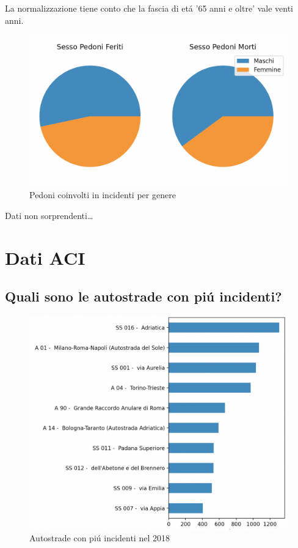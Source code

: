 \documentclass[a4paper]{report}
\begin{document}
La normalizzazione tiene conto che la fascia di et\'a '65 anni e oltre' vale venti anni.

\begin{figure}[!ht]
    \includegraphics[width=\linewidth]{../src/incidenti/incidenti_senza_coords/pedoni/sesso_morti_feriti.png}
    \caption{Pedoni coinvolti in incidenti per genere}
    \label{fig:sesso_morti_feriti}
\end{figure}

Dati non sorprendenti\dots





\newpage
\section{Dati ACI}

\newpage
\subsection{Quali sono le autostrade con pi\'u incidenti?}
\begin{figure}[!ht]
    \includegraphics[width=\linewidth]{../src/incidenti/incidenti_aci/autostrade.png}
    \caption{Autostrade con pi\'u incidenti nel 2018}
    \label{fig:incidenti_autostrade}
\end{figure}
\end{document}
